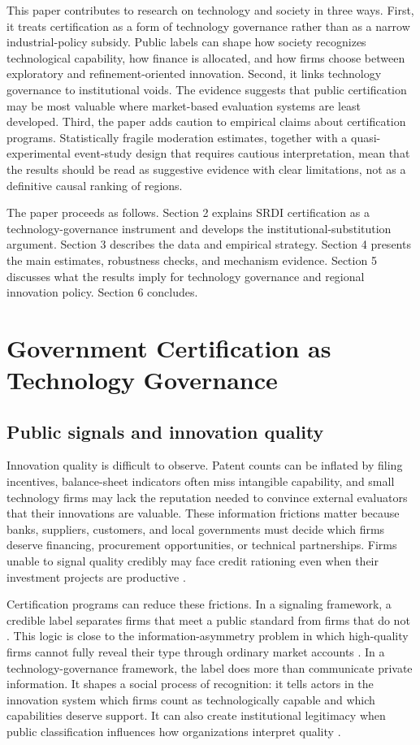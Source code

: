 \documentclass[12pt]{article}
\begin{document}
This paper contributes to research on technology and society in three ways. First, it treats certification as a form of technology governance rather than as a narrow industrial-policy subsidy. Public labels can shape how society recognizes technological capability, how finance is allocated, and how firms choose between exploratory and refinement-oriented innovation. Second, it links technology governance to institutional voids. The evidence suggests that public certification may be most valuable where market-based evaluation systems are least developed. Third, the paper adds caution to empirical claims about certification programs. Statistically fragile moderation estimates, together with a quasi-experimental event-study design that requires cautious interpretation, mean that the results should be read as suggestive evidence with clear limitations, not as a definitive causal ranking of regions.

The paper proceeds as follows. Section 2 explains SRDI certification as a technology-governance instrument and develops the institutional-substitution argument. Section 3 describes the data and empirical strategy. Section 4 presents the main estimates, robustness checks, and mechanism evidence. Section 5 discusses what the results imply for technology governance and regional innovation policy. Section 6 concludes.

\section{Government Certification as Technology Governance}

\subsection{Public signals and innovation quality}

Innovation quality is difficult to observe. Patent counts can be inflated by filing incentives, balance-sheet indicators often miss intangible capability, and small technology firms may lack the reputation needed to convince external evaluators that their innovations are valuable. These information frictions matter because banks, suppliers, customers, and local governments must decide which firms deserve financing, procurement opportunities, or technical partnerships. Firms unable to signal quality credibly may face credit rationing even when their investment projects are productive \citep{stiglitz1981}.

Certification programs can reduce these frictions. In a signaling framework, a credible label separates firms that meet a public standard from firms that do not \citep{spence1973}. This logic is close to the information-asymmetry problem in which high-quality firms cannot fully reveal their type through ordinary market accounts \citep{akerlof1970,leland1977}. In a technology-governance framework, the label does more than communicate private information. It shapes a social process of recognition: it tells actors in the innovation system which firms count as technologically capable and which capabilities deserve support. It can also create institutional legitimacy when public classification influences how organizations interpret quality \citep{dimaggio1983}.
\end{document}
